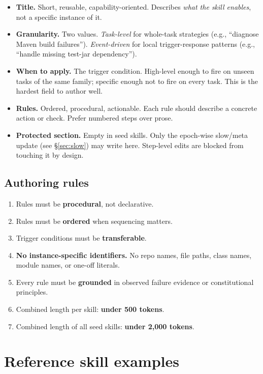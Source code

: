 \documentclass[11pt,a4paper]{article}
\begin{document}
\begin{itemize}[leftmargin=1.4em]
  \item \textbf{Title.} Short, reusable, capability-oriented.
  Describes \emph{what the skill enables}, not a specific instance of it.
  \item \textbf{Granularity.} Two values. \emph{Task-level} for
  whole-task strategies (e.g., ``diagnose Maven build failures'').
  \emph{Event-driven} for local trigger-response patterns
  (e.g., ``handle missing test-jar dependency'').
  \item \textbf{When to apply.} The trigger condition. High-level
  enough to fire on unseen tasks of the same family; specific enough
  not to fire on every task. This is the hardest field to author well.
  \item \textbf{Rules.} Ordered, procedural, actionable. Each rule
  should describe a concrete action or check. Prefer numbered steps
  over prose.
  \item \textbf{Protected section.} Empty in seed skills. Only the
  epoch-wise slow/meta update (see \S\ref{sec:slow}) may write here.
  Step-level edits are blocked from touching it by design.
\end{itemize}

\subsection{Authoring rules}

\begin{enumerate}[leftmargin=1.4em]
  \item Rules must be \textbf{procedural}, not declarative.
  \item Rules must be \textbf{ordered} when sequencing matters.
  \item Trigger conditions must be \textbf{transferable}.
  \item \textbf{No instance-specific identifiers.} No repo names, file
  paths, class names, module names, or one-off literals.
  \item Every rule must be \textbf{grounded} in observed failure
  evidence or constitutional principles.
  \item Combined length per skill: \textbf{under 500 tokens}.
  \item Combined length of all seed skills: \textbf{under 2,000 tokens}.
\end{enumerate}

\section{Reference skill examples}
\label{sec:examples}
\end{document}
